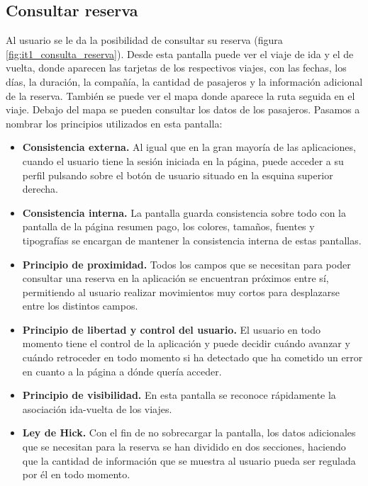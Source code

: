 \subsection*{Consultar reserva}

Al usuario se le da la posibilidad de consultar su reserva (figura \ref{fig:it1_consulta_reserva}). Desde esta pantalla puede ver el viaje de ida y el
de vuelta, donde aparecen las tarjetas de los respectivos viajes, con las fechas, los días, la duración, la compañía,
la cantidad de pasajeros y la información adicional de la reserva. También se puede ver el mapa donde aparece la
ruta seguida en el viaje. Debajo del mapa se pueden consultar los datos de los pasajeros. Pasamos a nombrar los
principios utilizados en esta pantalla:

\begin{itemize}
    \item \textbf{Consistencia externa.} Al igual que en la gran mayoría de las aplicaciones, cuando el usuario
        tiene la sesión iniciada en la página, puede acceder a su perfil pulsando sobre el botón de usuario situado
        en la esquina superior derecha.
    \item \textbf{Consistencia interna.} La pantalla guarda consistencia sobre todo con la pantalla de la página
        resumen pago, los colores, tamaños, fuentes y tipografías se encargan de mantener la consistencia interna
        de estas pantallas.
    \item \textbf{Principio de proximidad.} Todos los campos que se necesitan para poder consultar una reserva en
        la aplicación se encuentran próximos entre sí, permitiendo al usuario realizar movimientos muy cortos para
        desplazarse entre los distintos campos.
    \item \textbf{Principio de libertad y control del usuario.} El usuario en todo momento tiene el control de la
        aplicación y puede decidir cuándo avanzar y cuándo retroceder en todo momento si ha detectado que ha cometido
        un error en cuanto a la página a dónde quería acceder.
    \item \textbf{Principio de visibilidad.} En esta pantalla se reconoce rápidamente la asociación ida-vuelta de los
        viajes.
    \item \textbf{Ley de Hick.} Con el fin de no sobrecargar la pantalla, los datos adicionales que se necesitan para
        la reserva se han dividido en dos secciones, haciendo que la cantidad de información que se muestra al
        usuario pueda ser regulada por él en todo momento.
\end{itemize}


